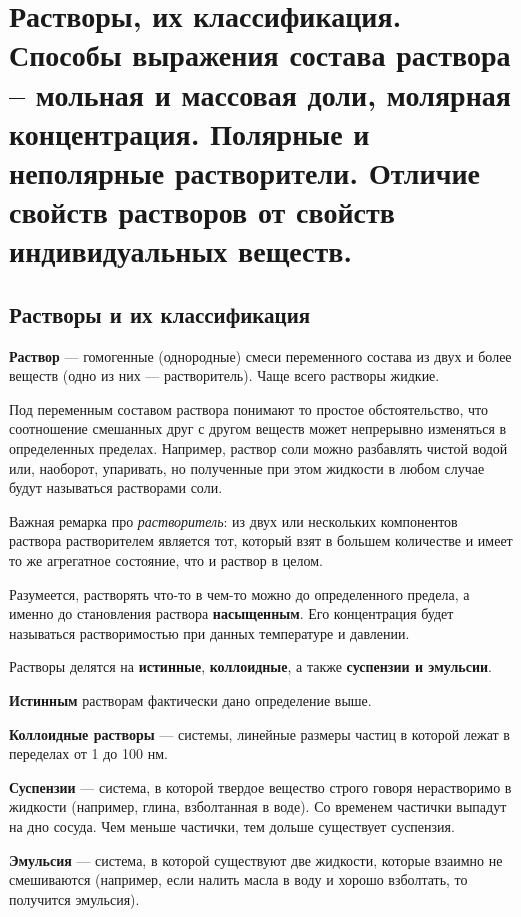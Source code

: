 \section{Растворы, их классификация. Способы выражения состава раствора – мольная и массовая доли, молярная концентрация. Полярные и неполярные растворители. Отличие свойств растворов от свойств индивидуальных веществ.}

\subsection{Растворы и их классификация}

\textbf{Раствор} --- гомогенные (однородные) смеси переменного состава из двух и более веществ (одно из них --- растворитель). Чаще всего растворы жидкие.

Под переменным составом раствора понимают то простое обстоятельство, что соотношение смешанных друг с другом веществ может непрерывно изменяться в определенных пределах. Например, раствор соли можно разбавлять чистой водой или, наоборот, упаривать, но полученные при этом жидкости в любом случае будут называться растворами соли.

Важная ремарка про \textit{растворитель}: из двух или нескольких компонентов раствора растворителем является тот, который взят в большем количестве и имеет то же агрегатное состояние, что и раствор в целом.

Разумеется, растворять что-то в чем-то можно до определенного предела, а именно до становления раствора \textbf{насыщенным}. Его концентрация будет называться растворимостью при данных температуре и давлении.

Растворы делятся на \textbf{истинные}, \textbf{коллоидные}, а также \textbf{суспензии и эмульсии}.

\textbf{Истинным} растворам фактически дано определение выше.

\textbf{Коллоидные растворы} --- системы, линейные размеры частиц в которой лежат в переделах от 1 до 100 нм.

\textbf{Суспензии} --- система, в которой твердое вещество строго говоря нерастворимо в жидкости (например, глина, взболтанная в воде). Со временем частички выпадут на дно сосуда. Чем меньше частички, тем дольше существует суспензия.

\textbf{Эмульсия} --- система, в которой существуют две жидкости, которые взаимно не смешиваются (например, если налить масла в воду и хорошо взболтать, то получится эмульсия).

